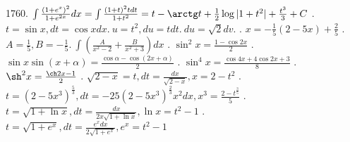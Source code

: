 \documentclass[12pt]{article}
\begin{document}
    1760. $\int \frac{(1+e^x)^2}{1+e^{2x}} dx = \int \frac{(1 + t)^2 t dt}{1 + t^2} = t - \arctg t + \frac12 \log|1+t^2| +\frac{t^3}3 + C$ . $t = \sin x, dt = \cos x dx.\ u = t^2, du = tdt.\ du = \sqrt{2} dv. $ . $x = -\frac15(2-5x)+\frac25$ . $A = \frac15, B = -\frac15.\ \int (\frac{A}{x^2 - 2} + \frac{B}{x^2 + 3})dx$ . $\sin^2 x = \frac{1-\cos 2x}{2}$ . $\sin x \sin(x + \alpha) = \frac{\cos \alpha - \cos(2x+\alpha)}{2}$ . $\sin^4 x = \frac{\cos 4x + 4 \cos 2x + 3}{8}$ . $\sh^2 x = \frac{\ch 2x - 1}2 $ . $\sqrt{2 - x} = t, dt = \frac{dx}{\sqrt{2-x}}, x = 2 - t^2$ . $t = (2 - 5x^3)^{\frac53}, dt = -25(2-5x^3)^{\frac23}x^2 dx, x^3 = \frac{2-t^{\frac35}}5$ . $t = \sqrt{1 + \ln x}, dt = \frac{dx}{2x\sqrt{1+\ln x}}, \ln x = t^2 - 1$ . $t = \sqrt{1+e^x}, dt = \frac{e^x dx}{2\sqrt{1+e^x}}, e^x = t^2 - 1$ \newline
\end{document}
